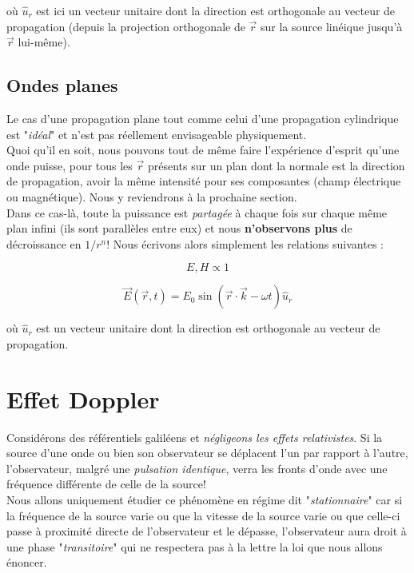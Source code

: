 où $\hat{u}_{r}$ est ici un vecteur unitaire dont la direction est orthogonale au vecteur de propagation (depuis la projection orthogonale de $\vec{r}$ sur la source linéique jusqu'à $\vec{r}$ lui-même).


\subsection{Ondes planes} 

Le cas d'une propagation plane tout comme celui d'une propagation cylindrique est "\textit{idéal}" et n'est pas réellement envisageable physiquement. \\
Quoi qu'il en soit, nous pouvons tout de même faire l'expérience d'esprit qu'une onde puisse, pour tous les $\vec{r}$ présents sur un plan dont la normale est la direction 
de propagation, avoir la même intensité pour ses composantes (champ électrique ou magnétique). Nous y reviendrons à la prochaine section. \\

Dans ce cas-là, toute la puissance est \textit{partagée} à chaque fois sur chaque même plan infini (ils sont parallèles entre eux) et nous \textbf{n'observons plus} de décroissance 
en $1/r^{n}$! Nous écrivons alors simplement les relations suivantes : 

\[E,H \propto 1\]

\[\vec{E}(\vec{r},t) = E_{0} \sin(\vec{r}\cdot \vec{k}-\omega t) \hat{u}_{r}\]

où $\hat{u}_{r}$ est un vecteur unitaire dont la direction est orthogonale au vecteur de propagation.

\section{Effet Doppler}

Considérons des référentiels galiléens et \textit{négligeons les effets relativistes}. 
Si la source d'une onde ou bien son observateur se déplacent l'un par rapport à l'autre, l'observateur, malgré une \textit{pulsation identique}, verra les fronts d'onde avec une fréquence différente de celle de la source! \\ 

Nous allons uniquement étudier ce phénomène en régime dit "\textit{stationnaire}" car si la fréquence de la source varie ou que la vitesse de la source varie ou que celle-ci 
passe à proximité directe de l'observateur et le dépasse, l'observateur aura droit à une phase "\textit{transitoire}" qui ne respectera pas à la lettre la loi que nous allons énoncer.  \\

